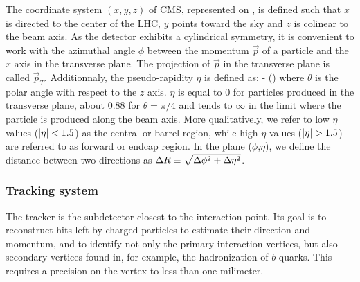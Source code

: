 
        The coordinate system $(x,y,z)$ of CMS, represented on ,
        is defined such that $x$ is directed to the center of the LHC, $y$ points toward
        the sky and $z$ is colinear to the beam axis. As the detector exhibits a
        cylindrical symmetry, it is convenient to work with the azimuthal angle $\phi$
        between the momentum $\vec{p}$ of a particle and the $x$ axis in the transverse
        plane. The projection of $\vec{p}$ in the transverse plane is called $\vec{p}_T$.
        Additionnaly, the pseudo-rapidity $\eta$ is defined as:
        {
            \eta {} - ()
        }
        where $\theta$ is the polar angle with respect to the $z$ axis. $\eta$ is equal
        to 0 for particles produced in
        the transverse plane, about 0.88 for $\theta = \pi/4$ and tends to $\infty$ in the
        limit where the particle is produced along the beam axis. More qualitatively, we
        refer to low $\eta$ values ($\left| \eta \right| < 1.5$) as the central or barrel region, while
        high $\eta$ values ($\left| \eta \right| > 1.5$) are referred to as forward or endcap region.
        In the plane ($\phi$,$\eta$), we define the distance between two directions as
        $\Delta R \equiv \sqrt{\Delta\phi^2 + \Delta \eta^2}$.


            \subsubsection{Tracking system}

        The tracker is the subdetector closest to the interaction point. Its goal
        is to reconstruct hits left by charged particles to estimate their direction
        and momentum, and to identify not only the primary interaction vertices, but also
        secondary vertices found in, for example, the hadronization of $b$ quarks. This requires
        a precision on the vertex to less than one milimeter.

